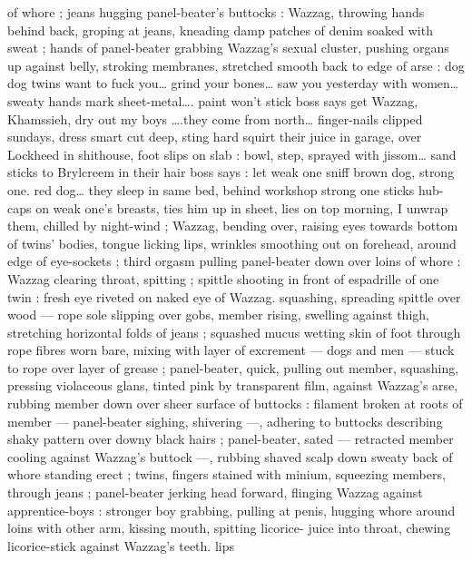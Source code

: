 of whore ; jeans hugging panel-beater's buttocks : Wazzag, throwing 
hands behind back, groping at jeans, kneading damp patches of 
denim soaked with sweat ; hands of panel-beater grabbing Wazzag's 
sexual cluster, pushing organs up against belly, stroking membranes, 
stretched smooth back to edge of arse : {\td} {\gl} {\td} dog{\td} dog{\td} twins want 
to fuck you{\ldots} grind your bones{\ldots} saw you yesterday with women{\ldots} 
sweaty hands mark sheet-metal{\ldots}. paint won't stick{\td} boss says {\gl} get 
Wazzag, Khamssieh, dry out my boys {\gr} {\ldots}.they come from north{\ldots} 
finger-nails clipped{\td} sundays, dress smart{\td} cut deep, sting hard{\td} 
squirt their juice in garage, over Lockheed{\td} in shithouse, foot slips 
on slab : bowl, step, sprayed with jissom{\ldots} sand sticks to Brylcreem 
in their hair{\td} boss says : {\gl}let weak one sniff brown dog, strong one. 
red dog{\gr}{\ldots} they sleep in same bed, behind workshop{\td} strong one 
sticks hub-caps on weak one's breasts, ties him up in sheet, lies on 
top{\td} morning, I unwrap them, chilled by night-wind{\td} {\gr} ; Wazzag, 
bending over, raising eyes towards bottom of twins' bodies, tongue 
licking lips, wrinkles smoothing out on forehead, around edge of 
eye-sockets ; third orgasm pulling panel-beater down over loins of 
whore : Wazzag clearing throat, spitting ; spittle shooting in front of 
espadrille of one twin : fresh eye riveted on naked eye of Wazzag. 
squashing, spreading spittle over wood --- rope sole slipping over 
gobs, member rising, swelling against thigh, stretching horizontal 
folds of jeans ; squashed mucus wetting skin of foot through rope 
fibres worn bare, mixing with layer of excrement --- dogs and men 
--- stuck to rope over layer of grease ; panel-beater, quick, pulling 
out member, squashing, pressing violaceous glans, tinted pink by 
transparent film, against Wazzag's arse, rubbing member down over 
sheer surface of buttocks : filament broken at roots of member --- 
panel-beater sighing, shivering ---, adhering to buttocks describing 
shaky pattern over downy black hairs ; panel-beater, sated --- 
retracted member cooling against Wazzag's buttock ---, rubbing 
shaved scalp down sweaty back of whore standing erect ; twins, 
fingers stained with minium, squeezing members, through jeans ; 
panel-beater jerking head forward, flinging Wazzag against 
apprentice-boys : stronger boy grabbing, pulling at penis, hugging 
whore around loins with other arm, kissing mouth, spitting licorice- 
juice into throat, chewing licorice-stick against Wazzag's teeth. lips 
